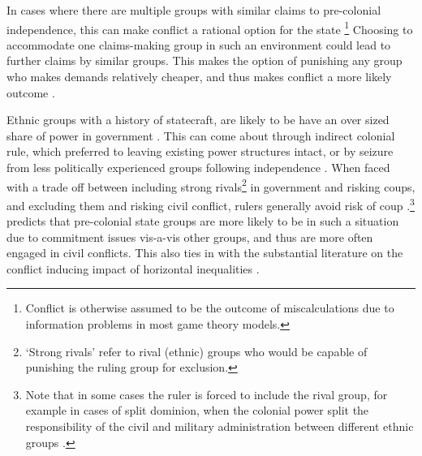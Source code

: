 \documentclass[12pt]{article}
\begin{document}
In cases where there are multiple groups with similar claims to pre-colonial
independence, this can make conflict a rational option for the state
\footnote{Conflict is otherwise assumed to be the outcome of miscalculations due
to information problems in most game theory models.} Choosing to accommodate one
claims-making group in such an environment could lead to further claims by
similar groups. This makes the option of punishing any group who makes demands
relatively cheaper, and thus makes conflict a more likely outcome
\citep{Wishman}.

Ethnic groups with a history of statecraft, are likely to be have an over sized
share of power in government \citep{Wucherpfennig2016}. This can come about
through indirect colonial rule, which preferred to leaving existing power
structures intact, or by seizure from less politically experienced groups
following independence \citep{Paine2019}. When faced with a trade off between
including strong rivals\footnote{`Strong rivals' refer to rival (ethnic) groups
who would be capable of punishing the ruling group for exclusion.} in government
and risking coups, and excluding them and risking civil conflict, rulers
generally avoid risk of coup \citep{Paine2019, Powell_2014,
	Roessler_2011}.\footnote{Note that in some cases the ruler is forced to
include the rival group, for example in cases of split dominion, when the
colonial power split the responsibility of the civil and military administration
between different ethnic groups \citep{Paine2019}.} \citet{Paine2019} predicts
that pre-colonial state groups are more likely to be in such a situation due to
commitment issues vis-a-vis other groups, and thus are more often engaged in
civil conflicts. This also ties in with the substantial literature on the
conflict inducing impact of horizontal inequalities \citep{CEDERMAN_2011}.
\end{document}
